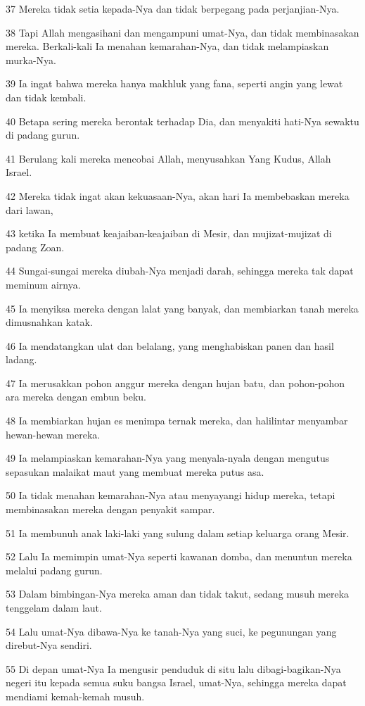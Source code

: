 \par 37 Mereka tidak setia kepada-Nya dan tidak berpegang pada perjanjian-Nya.
\par 38 Tapi Allah mengasihani dan mengampuni umat-Nya, dan tidak membinasakan mereka. Berkali-kali Ia menahan kemarahan-Nya, dan tidak melampiaskan murka-Nya.
\par 39 Ia ingat bahwa mereka hanya makhluk yang fana, seperti angin yang lewat dan tidak kembali.
\par 40 Betapa sering mereka berontak terhadap Dia, dan menyakiti hati-Nya sewaktu di padang gurun.
\par 41 Berulang kali mereka mencobai Allah, menyusahkan Yang Kudus, Allah Israel.
\par 42 Mereka tidak ingat akan kekuasaan-Nya, akan hari Ia membebaskan mereka dari lawan,
\par 43 ketika Ia membuat keajaiban-keajaiban di Mesir, dan mujizat-mujizat di padang Zoan.
\par 44 Sungai-sungai mereka diubah-Nya menjadi darah, sehingga mereka tak dapat meminum airnya.
\par 45 Ia menyiksa mereka dengan lalat yang banyak, dan membiarkan tanah mereka dimusnahkan katak.
\par 46 Ia mendatangkan ulat dan belalang, yang menghabiskan panen dan hasil ladang.
\par 47 Ia merusakkan pohon anggur mereka dengan hujan batu, dan pohon-pohon ara mereka dengan embun beku.
\par 48 Ia membiarkan hujan es menimpa ternak mereka, dan halilintar menyambar hewan-hewan mereka.
\par 49 Ia melampiaskan kemarahan-Nya yang menyala-nyala dengan mengutus sepasukan malaikat maut yang membuat mereka putus asa.
\par 50 Ia tidak menahan kemarahan-Nya atau menyayangi hidup mereka, tetapi membinasakan mereka dengan penyakit sampar.
\par 51 Ia membunuh anak laki-laki yang sulung dalam setiap keluarga orang Mesir.
\par 52 Lalu Ia memimpin umat-Nya seperti kawanan domba, dan menuntun mereka melalui padang gurun.
\par 53 Dalam bimbingan-Nya mereka aman dan tidak takut, sedang musuh mereka tenggelam dalam laut.
\par 54 Lalu umat-Nya dibawa-Nya ke tanah-Nya yang suci, ke pegunungan yang direbut-Nya sendiri.
\par 55 Di depan umat-Nya Ia mengusir penduduk di situ lalu dibagi-bagikan-Nya negeri itu kepada semua suku bangsa Israel, umat-Nya, sehingga mereka dapat mendiami kemah-kemah musuh.

